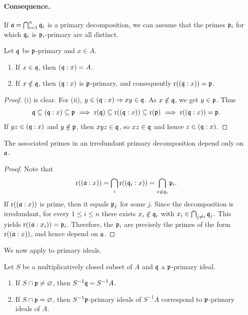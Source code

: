 \documentclass[11pt,a4paper]{article}
\begin{document}
\paragraph{Consequence.}
If $\aa=\bigcap_{i=1}^n\qq_i$ is a primary decomposition, we can assume that the primes $\pp_i$ for which $\qq_i$ is $\pp_i$-primary are all distinct.
\setcounter{theorem}{9}\begin{lemma}
Let $\qq$ be $\pp$-primary and $x\in A$.
\begin{enumerate}[label=(\roman*)]
\setcounter{enumi}{0}\item If $x\in\qq$, then $(\qq:x)=A$.
\setcounter{enumi}{1}\item If $x\notin\qq$, then $(\qq:x)$ is $\pp$-primary, and consequently $\rad((\qq:x))=\pp$.
\end{enumerate}
\end{lemma}
\begin{proof}
(i) is clear. For (ii), $y\in(\qq:x)\Rightarrow xy\in\qq$. As $x\notin\qq$, we get $y\in\pp$. Thus
\[
\qq\subseteq(\qq:x)\subseteq\pp
\ \Longrightarrow\ \rad(\qq)\subseteq\rad((\qq:x))\subseteq\rad(\pp)
\ \Longrightarrow\ \rad((\qq:x))=\pp.
\]
If $yz\in(\qq:x)$ and $y\notin\pp$, then $xyz\in\qq$, so $xz\in\qq$ and hence $z\in(\qq:x)$.
\end{proof}
\setcounter{theorem}{10}\begin{theorem}
The associated primes in an irredundant primary decomposition depend only on $\aa$.
\end{theorem}
\begin{proof}
Note that
\[\rad((\aa:x))=\bigcap_i\rad((\qq_i:x))=\bigcap_{x\notin\qq_i}\pp_i.\]
If $\rad((\aa:x))$ is prime, then it equals $\pp_j$ for some $j$. Since the decomposition is irredundant, for every $1\le i\le n$ there exists $x_i\notin\qq_i$ with $x_i\in\bigcap_{j\ne i}\qq_j$. This yields $\rad((\aa:x_i))=\pp_i$. Therefore, the $\pp_i$ are precisely the primes of the form $\rad((\aa:x))$, and hence depend on $\aa$.
\end{proof}
We now apply  to primary ideals.
\setcounter{theorem}{11}\begin{lemma}
Let $S$ be a multiplicatively closed subset of $A$ and $\qq$ a $\pp$-primary ideal.
\begin{enumerate}[label=(\roman*)]
\setcounter{enumi}{0}\item If $S\cap\pp\ne\varnothing$, then $S^{-1}\qq=S^{-1}A$.
\setcounter{enumi}{1}\item If $S\cap\pp=\varnothing$, then $S^{-1}\pp$-primary ideals of $S^{-1}A$ correspond to $\pp$-primary ideals of $A$.
\end{enumerate}
\end{lemma}
\end{document}
